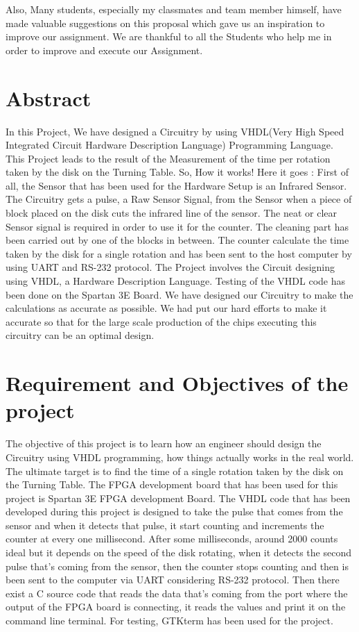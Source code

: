 \documentclass[12pt,a4paper]{article}
\begin{document}
Also, Many students, especially my classmates and team member himself, have made valuable suggestions on this proposal which gave us an inspiration to improve our assignment. We are thankful to all the Students who help me in order to improve and execute our Assignment.\\

\newpage
\section*{Abstract}
In this Project, We have designed a Circuitry by using VHDL(Very High Speed Integrated Circuit Hardware Description Language) Programming Language.  This Project leads to the result of the Measurement of the time per rotation taken by the disk on the Turning Table. So, How it works! Here it goes : First of all, the Sensor that has been used for the Hardware Setup is an Infrared Sensor. The Circuitry gets a pulse, a Raw Sensor Signal, from the Sensor when a piece of block placed on the disk cuts the infrared line of the sensor. The neat or clear Sensor signal is required in order to use it for the counter. The cleaning part has been carried out by one of the blocks in between. The counter calculate the time taken by the disk for a single rotation and has been sent to the host computer by using UART and RS-232 protocol. The Project involves the Circuit designing using VHDL, a Hardware Description Language. Testing of the VHDL code has been done on the Spartan 3E Board. We have designed our Circuitry to make the calculations as accurate as possible. We had put our hard efforts to make it accurate so that for the large scale production of the chips executing this circuitry can be an optimal design.\\


\newpage
\section*{Requirement and Objectives of the project}
The objective of this project is to learn how an engineer should design the Circuitry using VHDL programming, how things actually works in the real world. The ultimate target is to find the time of a single rotation taken by the disk on the Turning Table. The FPGA development board that has been used for this project is Spartan 3E FPGA development Board. The VHDL code that has been developed during this project is designed to take the pulse that comes from the sensor and when it detects that pulse, it start counting and increments the counter at every one millisecond. After some milliseconds, around 2000 counts ideal but it depends on the speed of the disk rotating, when it detects the second pulse that’s coming from the sensor, then the counter stops counting and then is been sent to the computer via UART considering RS-232 protocol. Then there exist a C source code that reads the data that’s coming from the port where the output of the FPGA board is connecting, it reads the values and print it on the command line terminal. For testing, GTKterm has been used for the project.\\
\end{document}
